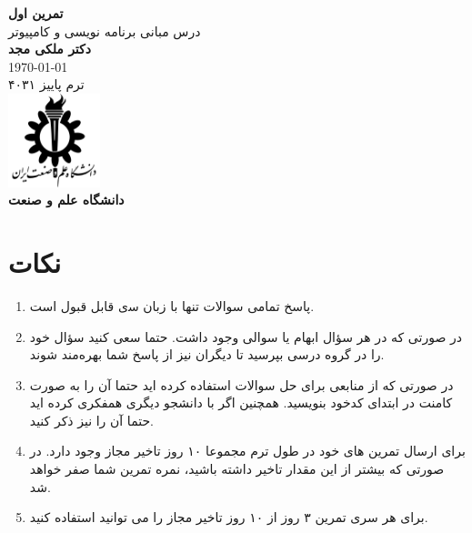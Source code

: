 \documentclass{article}
\begin{document}
\begin{titlepage}

    \centering

    \vspace*{2cm}
    {\Huge \textbf{تمرین اول}} \\[1cm]
    
    {\LARGE درس مبانی برنامه نویسی و کامپیوتر} \\[2cm]
    
    {\Large \textbf{دکتر ملکی مجد}} \\[0.5cm]
    
    {\large \today} \\[4cm]
    
    {\large ترم پاییز ۴۰۳۱} \\[2cm]
    
    \includegraphics[width=0.2\textwidth]{iustlogo.png} \\[0.2cm]
    \textbf{دانشگاه علم و صنعت}
    
\end{titlepage}

\section{نکات}
\begin{enumerate}
    \item  پاﺳﺦ ﺗﻤﺎمی ﺳﻮاﻻت ﺗﻨﻬﺎ ﺑﺎ زﺑﺎن ﺳی ﻗﺎﺑﻞ ﻗﺒﻮل اﺳﺖ.
    \item در صورتی که در هر سؤال ابهام یا سوالی وجود داشت. حتما سعی کنید سؤال خود را
    در گروه درسی بپرسید تا دیگران نیز از پاسخ شما بهره‌مند شوند.
    \item در صورتی که از منابعی برای حل سوالات استفاده کرده اید حتما آن را به صورت کامنت
    در ابتدای کدخود بنویسید. همچنین اگر با دانشجو دیگری همفکری کرده اید حتما آن
    را نیز ذکر کنید.
    \item برای ارسال تمرین های خود در طول ترم مجموعا ۱۰ روز تاخیر مجاز وجود دارد. در
    صورتی که بیشتر از این مقدار تاخیر داشته باشید، نمره تمرین شما صفر خواهد شد.
    \item برای هر سری تمرین ۳ روز از ۱۰ روز تاخیر مجاز را می توانید استفاده کنید.
\end{enumerate}
\end{document}
